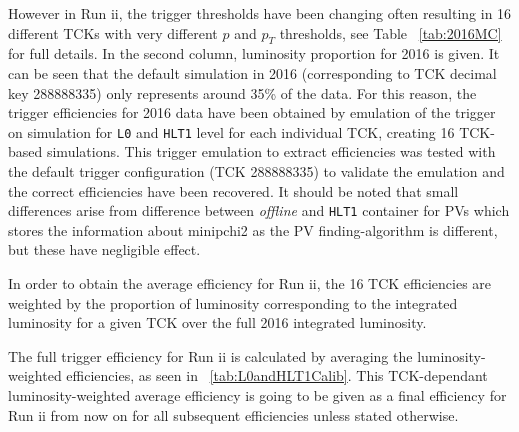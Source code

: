 However in Run \Rn{2}, the trigger thresholds have been changing often resulting in 16 different TCKs with very different $p$ and $p_{T}$ thresholds, see Table ~\autoref{tab:2016MC} for full details. In the second column, luminosity proportion for 2016 is given. It can be seen that the default simulation in 2016 (corresponding to TCK decimal key 288888335) only represents around 35\% of the data. For this reason, the trigger efficiencies for 2016 data have been obtained by emulation of the trigger on simulation for \texttt{L0} and \texttt{HLT1} level for each individual TCK, creating 16 TCK-based simulations.  This trigger emulation to extract efficiencies was tested with the default trigger configuration (TCK 288888335) to validate the emulation and the correct efficiencies have been recovered. It should be noted that small differences arise from difference between \textit{offline} and \texttt{HLT1} container for \gls{PV}s which stores the information about \gls{minipchi2} as the \gls{PV} finding-algorithm is different, but these have negligible effect. %

In order to obtain the average efficiency for Run \Rn{2}, the 16 TCK efficiencies are weighted by the proportion of luminosity corresponding to the integrated luminosity for a given TCK over the full 2016 integrated luminosity.

The full trigger efficiency for Run \Rn{2} is calculated by averaging the luminosity-weighted efficiencies, as seen in ~\autoref{tab:L0andHLT1Calib}. This TCK-dependant luminosity-weighted average efficiency is going to be given as a final efficiency for Run \Rn{2} from now on for all subsequent efficiencies unless stated otherwise.  

